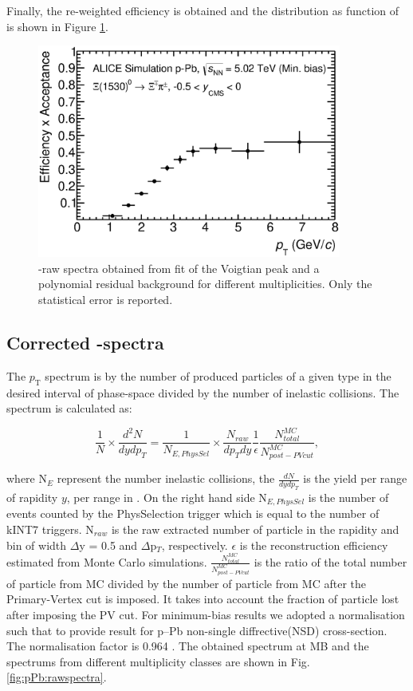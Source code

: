 Finally, the re-weighted efficiency is obtained and the distribution as function of \pt is shown in Figure \ref{fig:pPp:mbefficiency}.


\begin{figure}[htbp]
\begin{center}
\includegraphics[width=10.0cm]{./Version1/FigChapter5/MC/MBEfficiency.eps}
\caption{\xis-raw spectra obtained from fit of the Voigtian peak and a polynomial residual background for different multiplicities. Only the statistical error is reported.} 
 \label{fig:pPp:mbefficiency}
\end{center}
\end{figure}


\newpage
\subsection{Corrected \pt-spectra}\label{sec:pPb:spectra} 

The $p_{\mathrm{T}}$ spectrum is by the number of produced particles of a given type in the desired interval of phase-space divided by the number of inelastic collisions. The spectrum is calculated as:

\begin{equation}
\frac{1}{N} \times \frac{d^{2}N}{dydp_{T}} = \frac{1}{N_{E,PhysSel}} \times \frac{N_{raw}}{dp_{T}dy}  \frac{1}{\epsilon} \frac{N_{total}^{MC}}{N_{post-PV cut}^{MC}}   ,
\end{equation}

where N$_{E}$ represent the number inelastic collisions, the $\frac{dN}{dydp_{T}}$ is the yield  per range of rapidity $y$, per range in \pt. On the right hand side N$_{E,PhysSel}$ is the number of events counted by the PhysSelection trigger which is equal to the number of kINT7 triggers. N$_{raw}$ is the raw extracted number of particle in the rapidity and \pt bin of width  $\Delta$y = 0.5 and $\Delta$p$_{T}$, respectively. $\epsilon$ is the reconstruction efficiency estimated from Monte Carlo simulations. $\frac{N_{total}^{MC}}{N_{post-PV cut}^{MC}}$ is the ratio of the total number of particle from MC divided by the number of particle from MC after the Primary-Vertex cut is imposed. It takes into account the fraction of particle lost after imposing the PV cut. For minimum-bias results we adopted a normalisation such that to provide result for p--Pb non-single diffrective(NSD) cross-section. The normalisation factor is 0.964 \cite{cite:KphipPb}. The obtained spectrum at MB and the spectrums from different multiplicity classes are shown in Fig. \ref{fig:pPb:rawspectra}.

